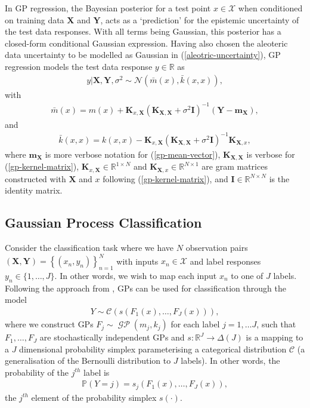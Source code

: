 \documentclass{article}
\newcommand{\GP}{\operatorname{\mathcal{GP}}}
\numberwithin{equation}{section}
\begin{document}
In GP regression, the Bayesian posterior for a test point $x \in \mathcal{X}$ when conditioned on training data $\mathbf{X}$ and $\mathbf{Y}$, acts as a `prediction' for the epistemic uncertainty of the test data responses. With all terms being Gaussian, this posterior has a closed-form conditional Gaussian expression.
Having also chosen the aleoteric data uncertainty to be modelled as Gaussian in (\ref{aleotric-uncertainty}), GP regression models the test data response $y \in \mathbb{R}$ as
\begin{align}
    y \vert \mathbf{X}, \mathbf{Y}, \sigma^2
    \sim \mathcal{N}\left(\bar{m}(x), \bar{k}(x, x)\right),
    \label{gp-posterior-normal}
\end{align}
with
\begin{align}
    \label{gp-posterior-mean}
    \bar{m}(x) = m(x) + \mathbf{K}_{x, \mathbf{X}} \left(\mathbf{K}_{\mathbf{X}, \mathbf{X}} + \sigma^2 \mathbf{I}\right)^{-1} \left( \mathbf{Y} - \mathbf{m}_{\mathbf{X}}\right),
\end{align}
and
\begin{align}
    \label{gp-posterior-covariance}
    \bar{k}(x, x) = k(x, x) - \mathbf{K}_{x, \mathbf{X}} \left(\mathbf{K}_{\mathbf{X}, \mathbf{X}} + \sigma^2 \mathbf{I}\right)^{-1} \mathbf{K}_{\mathbf{X}, x},
\end{align}
where $\mathbf{m}_{\mathbf{X}}$ is more verbose notation for (\ref{gp-mean-vector}), $\mathbf{K}_{\mathbf{X}, \mathbf{X}}$ is verbose for (\ref{gp-kernel-matrix}), $\mathbf{K}_{x, \mathbf{X}} \in \mathbb{R}^{1 \times N}$ and $\mathbf{K}_{\mathbf{X}, x} \in \mathbb{R}^{N \times 1}$ are gram matrices constructed with $\mathbf{X}$ and $x$ following (\ref{gp-kernel-matrix}), and $\mathbf{I} \in \mathbb{R}^{N \times N}$ is the identity matrix.

\subsection{Gaussian Process Classification}
Consider the classification task where we have $N$ observation pairs $(\mathbf{X}, \mathbf{Y}) = \left\{(x_n, y_n)\right\}_{n=1}^{N}$ with inputs $x_n \in \mathcal{X}$ and label responses $y_n \in \{1, \dots, J\}$. In other words, we wish to map each input $x_n$ to one of $J$ labels. Following the approach from \cite{matthews2017scalable}, GPs can be used for classification through the model
\begin{align}
    Y \sim \mathcal{C}\left(s(F_1(x), \dots, F_J(x))\right),
    \label{gp-classifier}
\end{align}
where we construct GPs $F_j \sim \GP\left(m_j, k_j\right)$ for each label $j=1, \dots J$, such that $F_1, \dots, F_J$ are stochastically independent GPs and $s: \mathbb{R}^J \rightarrow \Delta(J)$ is a mapping to a $J$ dimensional probability simplex parameterising a categorical distribution $\mathcal{C}$ (a generalisation of the Bernoulli distribution to $J$ labels). In other words, the probability of the $j^{th}$ label is
\begin{align}
    \mathbb{P}(Y=j) = s_j(F_1(x), \dots, F_J(x)),
\end{align}
the $j^{th}$ element of the probability simplex $s(\cdot)$.
\end{document}
